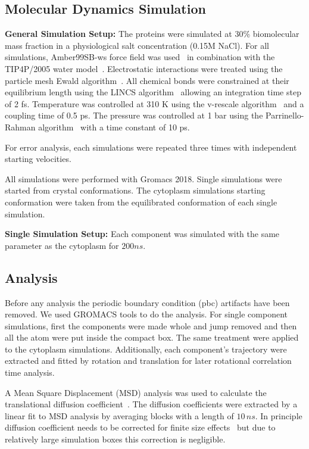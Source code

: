 \documentclass[journal=jacsat,manuscript=article]{achemso}
\begin{document}
\subsection*{Molecular Dynamics Simulation}

 
{\bf General Simulation Setup: }The proteins were simulated at 30\% biomolecular mass fraction in  a physiological salt concentration (0.15M NaCl). For all simulations, Amber99SB-ws force field was used~\cite{Best2014a} in combination with the TIP4P/2005 water model~\cite{Abascal2005b}. Electrostatic interactions were treated using the particle mesh Ewald algorithm~\cite{Essmann1995a}. All chemical bonds were constrained at their equilibrium length using the LINCS algorithm~\cite{Hess2008b} allowing an integration time step of 2 fs. Temperature was controlled at 310 K using the v-rescale algorithm~\cite{Bussi2007a} and a coupling time of 0.5 ps. The pressure was controlled at 1 bar using the Parrinello-Rahman algorithm~\cite{Parrinello1981a} with a time constant of 10 ps.  


For error analysis, each simulations were repeated three times with independent starting velocities.

All simulations were performed with Gromacs 2018. Single simulations were started from crystal conformations. The cytoplasm simulations starting conformation were taken from the equilibrated conformation of each single simulation.

{\bf Single Simulation Setup: } Each component was simulated with the same parameter as the cytoplasm for $200 ns$.

\subsection*{Analysis}
Before any analysis the periodic boundary condition (pbc) artifacts have been removed. We used GROMACS tools to do the analysis. For single component simulations, first the components were made whole and jump removed and then all the atom were put inside the compact box. The same treatment were applied to the cytoplasm simulations. Additionally, each component's trajectory were extracted and fitted by rotation and translation for later rotational correlation time analysis. 


A Mean Square Displacement (MSD) analysis was used to calculate the translational diffusion coefficient~\cite{Allen1987a}. The diffusion coefficients were extracted by a linear fit to MSD analysis by averaging blocks with a length of $10 \,ns$. In principle diffusion coefficient needs to be corrected for finite size effects~\cite{Yeh2004} but due to relatively large simulation boxes this correction is negligible.
\end{document}
